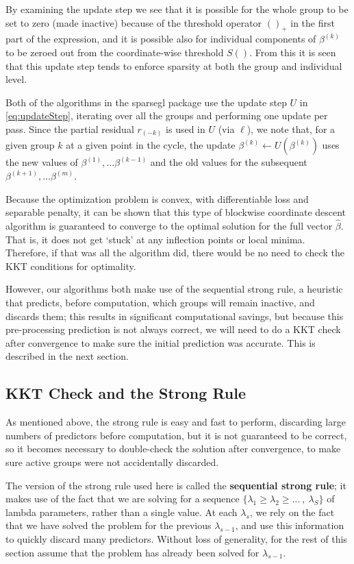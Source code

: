 \documentclass[12pt]{article}
\newcommand{\pkg}[1]{{\normalfont\fontseries{b}\selectfont #1}}
\begin{document}
By examining the update step we see that it is possible for the whole group to be set to zero (made inactive) because of the threshold operator $()_+$ in the first part of the expression, and it is possible also for individual components of $\beta^{(k)}$ to be zeroed out from the coordinate-wise threshold $S()$. From this it is seen that this update step tends to enforce sparsity at both the group and individual level.

Both of the algorithms in the \pkg{sparsegl} package use the update step $U$ in \autoref{eq:updateStep}, iterating over all the groups and performing one update per pass. Since the partial residual $r_{(-k)}$ is used in $U$ (via $\ell$), we note that, for a given group $k$ at a given point in the cycle, the update $\beta^{(k)} \leftarrow U(\beta^{(k)})$ uses the new values of $\beta^{(1)}, \dots \beta^{(k-1)}$ and the old values for the subsequent $\beta^{(k+1)},\dots \beta^{(m)}$.

Because the optimization problem is convex, with differentiable loss and separable penalty, it can be shown that this type of blockwise coordinate descent algorithm is guaranteed to converge to the optimal solution for the full vector $\hat{\beta}$. That is, it does not get `stuck' at any inflection points or local minima. Therefore, if that was all the algorithm did, there would be no need to check the KKT conditions for optimality. 

However, our algorithms both make use of the sequential strong rule, a heuristic that predicts, before computation, which groups will remain inactive, and discards them; this results in significant computational savings, but because this pre-processing prediction is not always correct, we will need to do a KKT check \citep{boyd2004convex} after convergence to make sure the initial prediction was accurate. This is described in the next section.

\subsection{KKT Check and the Strong Rule}

As mentioned above, the strong rule \citep{tibshirani2012strong} is easy and fast to perform, discarding large numbers of predictors before computation, but it is not guaranteed to be correct, so it becomes necessary to double-check the solution after convergence, to make sure active groups were not accidentally discarded. 

The version of the strong rule used here is called the \textbf{sequential strong rule}; it makes use of the fact that we are solving for a sequence $\{\lambda_1 \geq \lambda_2 \geq \dots \ ,\ \lambda_S\}$ of lambda parameters, rather than a single value. At each $\lambda_s$, we rely on the fact that we have solved the problem for the previous $\lambda_{s-1}$, and use this information to quickly discard many predictors. Without loss of generality, for the rest of this section assume that the problem has already been solved for $\lambda_{s-1}$.
\end{document}
